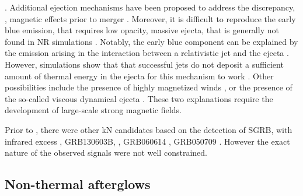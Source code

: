 \citep{Sekiguchi:2016bjd,Siegel:2019mlp,Perego:2017wtu,Kawaguchi:2018ptg}.
%
Additional ejection mechanisms have been proposed to address the discrepancy, \eg, 
magnetic effects prior to merger \citep{Metzger:2018qfl,Fernandez:2018kax,Radice:2018ghv}. 
Moreover, it is difficult to reproduce the early blue emission, that requires 
low opacity, massive ejecta, that is generally not found in \ac{NR} 
simulations \citep{Fahlman:2018llv}. 
Notably, the early blue component can be explained by the emission arising 
in the interaction between a relativistic jet and the ejecta
\citep{Lazzati:2016yxl,Bromberg:2017crh,Piro:2017ayh}.
However, simulations show that that successful jets do not deposit a sufficient amount of thermal energy in the ejecta for this mechanism to work \citep{Duffell:2018iig}. 
Other possibilities include the presence of highly magnetized winds \citep{Metzger:2018uni,Fernandez:2018kax},
or the presence of the so-called viscous dynamical ejecta \citep{Radice:2018ghv}.
These two explanations require the development of large-scale strong magnetic fields.


Prior to \AT{}, there were other \ac{kN} candidates based on the 
detection of \ac{SGRB}, with infrared excess \eg, 
GRB130603B, \citep{Berger:2013wna,Tanvir:2013pia}, 
GRB060614 \citep{Jin:2015txa,Yang:2015pha}, 
GRB050709 \citep{Jin:2016pnm}.
However the exact nature of the observed signals were not well constrained. 


\subsection{Non-thermal afterglows}

